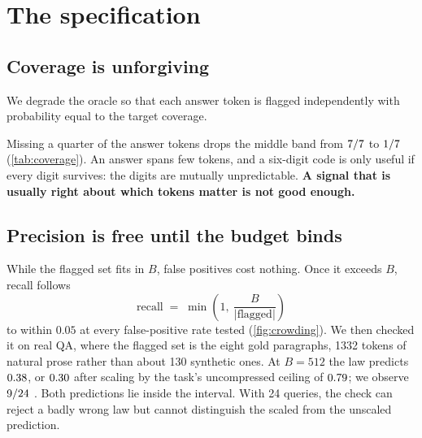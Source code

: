 \documentclass[10pt]{article}
\begin{document}
\section{The specification}\label{sec:spec}

\subsection{Coverage is unforgiving}

We degrade the oracle so that each answer token is flagged independently with
probability equal to the target coverage.

\begin{table}[ht]\centering\small
\caption{Degraded oracles on synthetic needles ($B{=}2048$, 24 queries per
row, three seeds). Coverage is the probability that each answer token is
flagged. The screen column replays the same flags the end-to-end run drew
(\cref{sec:test}), so the two columns describe one run rather than two.}
\label{tab:coverage}
\TabCoverage
\end{table}

Missing a quarter of the answer tokens drops the middle band from
$7/7$ to $1/7$ (\cref{tab:coverage}). An answer spans
few tokens, and a six-digit code is only useful if every digit survives: the
digits are mutually unpredictable. \textbf{A signal that is usually right
about which tokens matter is not good enough.}

\subsection{Precision is free until the budget binds}

While the flagged set fits in $B$, false positives cost nothing. Once it
exceeds $B$, recall follows
\begin{equation}
  \text{recall} \;=\; \min\!\left(1,\ \frac{B}{|\text{flagged}|}\right)
  \label{eq:crowding}
\end{equation}
to within $0.05$ at every false-positive rate tested (\cref{fig:crowding}).
We then checked it on real QA, where the flagged set is the eight gold
paragraphs, 1332 tokens of natural prose rather than about 130 synthetic ones. At
$B{=}512$ the law predicts $0.38$, or $0.30$ after scaling
by the task's uncompressed ceiling of $0.79$; we observe $9/24$
\CrowdObsCI. Both predictions lie inside the interval. With 24 queries, the
check can reject a badly wrong law but cannot distinguish the scaled from the
unscaled prediction.
\end{document}
